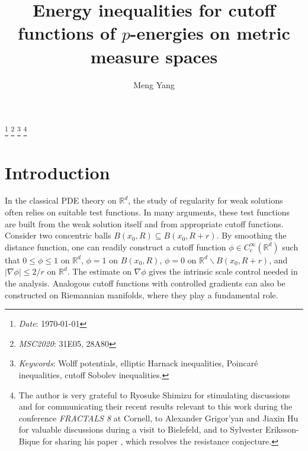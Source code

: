 \documentclass[11pt,a4paper]{article}
\numberwithin{equation}{section}
\theoremstyle{plain}
\theoremstyle{definition}
\renewcommand{\thefootnote}{}
\begin{document}
\title{\large{Energy inequalities for cutoff functions of $p$-energies on metric measure spaces}}
\author{Meng Yang}
\date{}

\maketitle


\footnote{\textsl{Date}: \today}
\footnote{\textsl{MSC2020}: 31E05, 28A80}
\footnote{\textsl{Keywords}: Wolff potentials, elliptic Harnack inequalities, Poincar\'e inequalities, cutoff Sobolev inequalities.}
\footnote{The author is very grateful to Ryosuke Shimizu for stimulating discussions and for communicating their recent results relevant to this work during the conference \textit{FRACTALS 8} at Cornell, to Alexander Grigor'yan and Jiaxin Hu for valuable discussions during a visit to Bielefeld, and to Sylvester Eriksson-Bique for sharing his paper \cite{Eri26}, which resolves the resistance conjecture.}

\renewcommand{\thefootnote}{\arabic{footnote}}
\setcounter{footnote}{0}

\section{Introduction}

In the classical PDE theory on $\mathbb{R}^{d}$, the study of regularity for weak solutions often relies on suitable test functions. In many arguments, these test functions are built from the weak solution itself and from appropriate cutoff functions. Consider two concentric balls $B(x_{0},R)\subseteq B(x_{0},R+r)$. By smoothing the distance function, one can readily construct a cutoff function $\phi\in C_{c}^{\infty}(\mathbb{R}^{d})$ such that $0\le \phi\le 1$ on $\mathbb{R}^d$, $\phi=1$ on $B(x_{0},R)$, $\phi=0$ on $\mathbb{R}^{d}\backslash B(x_{0},R+r)$, and $|\nabla \phi|\le 2/r$ on $\mathbb{R}^{d}$. The estimate on $\nabla \phi$ gives the intrinsic scale control needed in the analysis. Analogous cutoff functions with controlled gradients can also be constructed on Riemannian manifolds, where they play a fundamental role.
\end{document}
